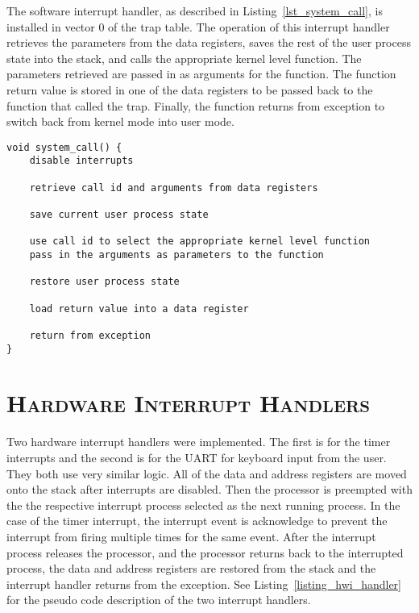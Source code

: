 \documentclass[oneside]{report}
\begin{document}
The software interrupt handler, as described in Listing~\ref{lst_system_call},
is installed in vector 0 of the trap table. The operation of this interrupt
handler retrieves the parameters from the data registers, saves the rest of
the user process state into the stack, and calls the appropriate kernel level
function. The parameters retrieved are passed in as arguments for the function.
The function return value is stored in one of the data registers to be passed
back to the function that called the trap. Finally, the function returns from
exception to switch back from kernel mode into user mode.

\begin{lstlisting}
void system_call() {
    disable interrupts

    retrieve call id and arguments from data registers

    save current user process state

    use call id to select the appropriate kernel level function 
    pass in the arguments as parameters to the function

    restore user process state

    load return value into a data register

    return from exception
}
\end{lstlisting}

\section{\textsc{Hardware Interrupt Handlers}}
Two hardware interrupt handlers were implemented. The first is for the timer
interrupts and the second is for the UART for keyboard input from the user.
They both use very similar logic. All of the data and address registers are
moved onto the stack after interrupts are disabled. Then the processor is
preempted with the the respective interrupt process selected as the next
running process. In the case of the timer interrupt, the interrupt event is
acknowledge to prevent the interrupt from firing multiple times for the same
event. After the interrupt process releases the processor, and the processor
returns back to the interrupted process, the data and address registers are
restored from the stack and the interrupt handler returns from the exception.
See Listing~\ref{listing_hwi_handler} for the pseudo code description of the
two interrupt handlers.
\end{document}
